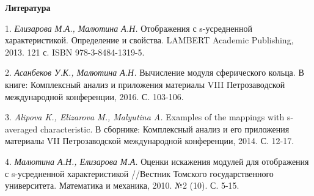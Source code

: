 \smallskip \centerline{\bf Литература}\nopagebreak

1. {\it Елизарова М.А., Малютина А.Н. } Отображения с s-усредненной характеристикой. Определение и свойства. LAMBERT Academic Publishing, 2013. 121 с. ISBN 978-3-8484-1319-5.


2. {\it Асанбеков У.К., Малютина А.Н. } Вычисление модуля сферического кольца. В книге: Комплексный анализ и приложения материалы VIII Петрозаводской международной конференции, 2016. С. 103-106.

3. {\it	Alipova K., Elizarova M., Malyutina A. } Examples of the mappings with s-averaged characteristic. В сборнике: Комплексный анализ и его приложения материалы VII Петрозаводской международной конференции, 2014. С. 12-17.

4. {\it	Малютина А.Н., Елизарова М.А. } Оценки искажения модулей для отображения с s-усредненной характеристикой //Вестник Томского государственного университета. Математика и механика, 2010. №2 (10). С. 5-15.

